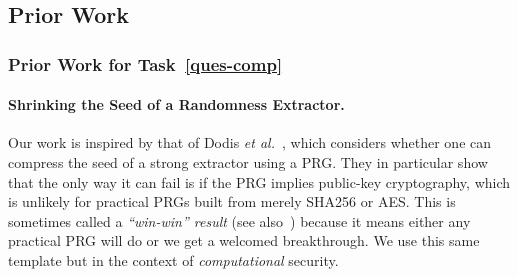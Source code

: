 


\subsection{Prior Work}

\subsubsection{Prior Work for Task~\ref{ques-comp}}


\paragraph*{Shrinking the Seed of a Randomness Extractor.}  
Our work is inspired by that of Dodis \emph{et al.}~\cite{C:BDKPPS11}, which considers whether one can compress the seed of a  strong extractor using a PRG.  They in particular show that the only way it can fail is if the PRG implies public-key cryptography, which is unlikely for practical PRGs built from merely SHA256 or AES. This is sometimes called a \emph{``win-win'' result} (see also~\cite{EC:Pietrzak06,C:Dziembowski06}) because it means either any practical PRG will do or we get a welcomed breakthrough.   We use this same template but in the context of \emph{computational} security.





